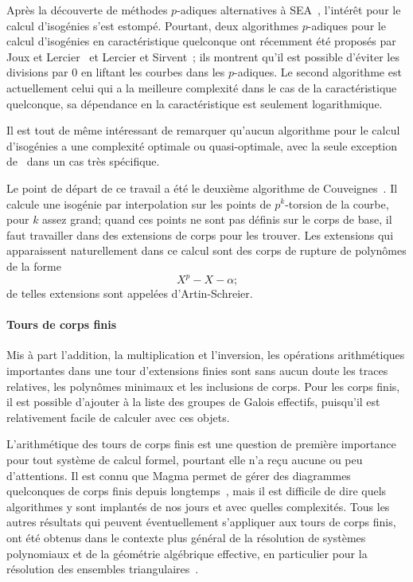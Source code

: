 Après la découverte de méthodes $p$-adiques alternatives à
SEA~\cite{satoh00,fouquet+gaudry+harley00}, l'intérêt pour le calcul
d'isogénies s'est estompé. Pourtant, deux algorithmes $p$-adiques pour
le calcul d'isogénies en caractéristique quelconque ont récemment été
proposés par Joux et Lercier~\cite{joux+lercier06} et Lercier et
Sirvent~\cite{lercier+sirvent08}; ils montrent qu'il est possible
d'éviter les divisions par $0$ en liftant les courbes dans les
$p$-adiques. Le second algorithme est actuellement celui qui a la
meilleure complexité dans le cas de la caractéristique quelconque, sa
dépendance en la caractéristique est seulement logarithmique.

Il est tout de même intéressant de remarquer qu'aucun algorithme pour
le calcul d'isogénies a une complexité optimale ou quasi-optimale,
avec la seule exception de~\cite{bostan+morain+salvy+schost08} dans un
cas très spécifique.

Le point de départ de ce travail a été le deuxième algorithme de
Couveignes~\cite{couveignes96}. Il calcule une isogénie par
interpolation sur les points de $p^k$-torsion de la courbe, pour $k$
assez grand; quand ces points ne sont pas définis sur le corps de
base, il faut travailler dans des extensions de corps pour les
trouver. Les extensions qui apparaissent naturellement dans ce calcul sont des corps de rupture de polynômes de la forme
\[X^p-X-\alpha\text{;}\] de telles extensions sont appelées
d'Artin-Schreier.

\paragraph*{Tours de corps finis}
\label{sec:tours-de-corps}
Mis à part l'addition, la multiplication et l'inversion, les
opérations arithmétiques importantes dans une tour d'extensions finies
sont sans aucun doute les traces relatives, les polynômes minimaux et
les inclusions de corps. Pour les corps finis, il est possible
d'ajouter à la liste des groupes de Galois effectifs, puisqu'il est
relativement facile de calculer avec ces objets.

L'arithmétique des tours de corps finis est une question de première
importance pour tout système de calcul formel, pourtant elle n'a reçu
aucune ou peu d'attentions. Il est connu que Magma permet de gérer des
diagrammes quelconques de corps finis depuis
longtemps~\cite{bosma+cannon+steel97}, mais il est difficile de dire
quels algorithmes y sont implantés de nos jours et avec quelles
complexités. Tous les autres résultats qui peuvent éventuellement
s'appliquer aux tours de corps finis, ont été obtenus dans le contexte
plus général de la résolution de systèmes polynomiaux et de la
géométrie algébrique effective, en particulier pour la résolution des
ensembles
triangulaires~\cite{diaz+gonzalez01,giusti+lecerf+salvy01,bostan+salvy+schost03,pascal+schost06,li+moreno+schost07,dahan+jin+moreno+schost08,boulier+lemaire+moreno01,FGLM,rouiller99,alonso+becker+roy+wormann}.

